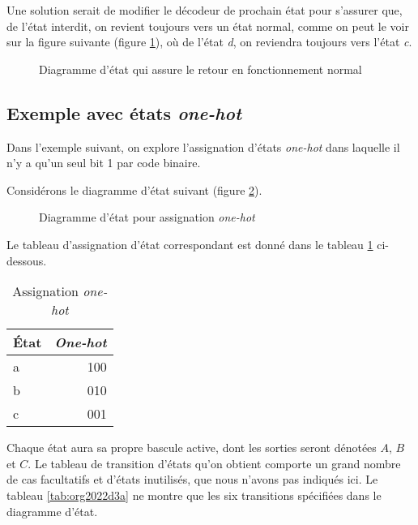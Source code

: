 \documentclass[11pt]{article}
\begin{document}
Une solution serait de modifier le décodeur de prochain état pour
s'assurer que, de l'état interdit, on revient toujours vers un état
normal, comme on peut le voir sur la figure suivante (figure
\ref{fig:org5f970cb}), où de l'état \emph{d}, on reviendra toujours
vers l'état \emph{c}. 

\begin{figure}[htbp]
\centering

\caption{\label{fig:org5f970cb}Diagramme d'état qui assure le retour en fonctionnement normal}
\end{figure}

\subsection{Exemple avec états \emph{one-hot}}
\label{sec:org839034d}

Dans l'exemple suivant, on explore l'assignation d'états \emph{one-hot}
dans laquelle il n'y a qu'un seul bit 1 par code binaire.

Considérons le diagramme d'état suivant (figure \ref{fig:orgeae37c7}).

\begin{figure}[htbp]
\centering

\caption{\label{fig:orgeae37c7}Diagramme d'état pour assignation \emph{one-hot}}
\end{figure}

Le tableau d'assignation d'état correspondant est donné dans le
tableau \ref{tab:orgf69c99b} ci-dessous.

\begin{table}[htbp]
\caption{\label{tab:orgf69c99b}Assignation \emph{one-hot}}
\centering
\begin{tabular}{lr}
État & \emph{One-hot}\\
\hline
a & 100\\
b & 010\\
c & 001\\
\end{tabular}
\end{table}

Chaque état aura sa propre bascule active, dont les sorties seront
dénotées \(A\), \(B\) et \(C\). Le tableau de transition d'états qu'on
obtient comporte un grand nombre de cas facultatifs et d'états
inutilisés, que nous n'avons pas indiqués ici. Le tableau
\ref{tab:org2022d3a} ne montre que les six transitions spécifiées
dans le diagramme d'état.
\end{document}

